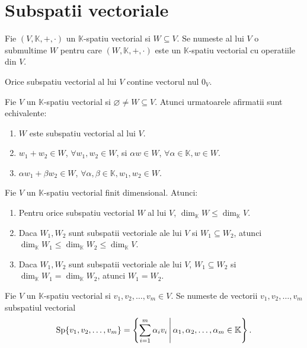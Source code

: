 \documentclass{article}
\begin{document}
\section{Subspatii vectoriale}
\begin{enumerate}

   Fie $(V, \mathbb{K}, +, \cdot)$ un $\mathbb{K}$-spatiu vectorial si $W \subseteq V$. Se numeste  al lui $V$ o submultime $W$ pentru care $(W, \mathbb{K}, +, \cdot)$ este un $\mathbb{K}$-spatiu vectorial cu operatiile din $V$.

  \proprietate Orice subspatiu vectorial al lui $V$ contine vectorul nul $0_V$.

  \propozitie Fie $V$ un $\mathbb{K}$-spatiu vectorial si $\varnothing \neq W \subseteq V$. Atunci urmatoarele afirmatii sunt echivalente:
  \begin{enumerate}
    \item $W$ este subspatiu vectorial al lui $V$.
    \item $w_1 + w_2 \in W$, $\forall w_1, w_2 \in W$, si $\alpha w \in W$, $\forall \alpha \in \mathbb{K}, w \in W$.
    \item $\alpha w_1 + \beta w_2 \in W$, $\forall \alpha, \beta \in \mathbb{K}, w_1, w_2 \in W$.
  \end{enumerate}

  \begin{samepage}
    \propozitie Fie $V$ un $\mathbb{K}$-spatiu vectorial finit dimensional. Atunci:
    \begin{enumerate}
      \item Pentru orice subspatiu vectorial $W$ al lui $V$, $\dim_{\mathbb{K}} W \leq \dim_{\mathbb{K}} V$.
      \item Daca $W_1, W_2$ sunt subspatii vectoriale ale lui $V$ si $W_1 \subseteq W_2$, atunci $\dim_{\mathbb{K}} W_1 \leq \dim_{\mathbb{K}} W_2 \leq \dim_{\mathbb{K}} V$.
      \item Daca $W_1, W_2$ sunt subspatii vectoriale ale lui $V$, $W_1 \subseteq W_2$ si $\dim_{\mathbb{K}} W_1 = \dim_{\mathbb{K}} W_2$, atunci $W_1 = W_2$.
    \end{enumerate}
  \end{samepage}

   Fie $V$ un $\mathbb{K}$-spatiu vectorial si $v_1, v_2, \dots, v_m \in V$. Se numeste  de vectorii $v_1, v_2, \dots, v_m$ subspatiul vectorial
  \[
    \operatorname{Sp}\{v_1, v_2, \dots, v_m\}
    = \left\{\sum_{i=1}^m \alpha_i v_i \,\middle\vert\, \alpha_1, \alpha_2, \dots, \alpha_m \in \mathbb{K}\right\}.
  \]


\end{enumerate}
\end{document}
